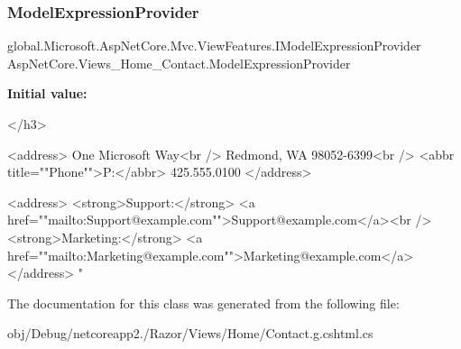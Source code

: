 \subsubsection{\texorpdfstring{Model\+Expression\+Provider}{ModelExpressionProvider}}
{\footnotesize\ttfamily global.\+Microsoft.\+Asp\+Net\+Core.\+Mvc.\+View\+Features.\+I\+Model\+Expression\+Provider Asp\+Net\+Core.\+Views\+\_\+\+Home\+\_\+\+Contact.\+Model\+Expression\+Provider\hspace{0.3cm}{\ttfamily [get]}}

{\bfseries Initial value\+:}
\begin{DoxyCode}
</h3>

<address>
    One Microsoft Way<br />
    Redmond, WA 98052-6399<br />
    <abbr title=\textcolor{stringliteral}{""}Phone\textcolor{stringliteral}{""}>P:</abbr>
    425.555.0100
</address>

<address>
    <strong>Support:</strong> <a href=\textcolor{stringliteral}{""}mailto:Support@example.com\textcolor{stringliteral}{""}>Support@example.com</a><br />
    <strong>Marketing:</strong> <a href=\textcolor{stringliteral}{""}mailto:Marketing@example.com\textcolor{stringliteral}{""}>Marketing@example.com</a>
</address>
\textcolor{stringliteral}{"}
\end{DoxyCode}


The documentation for this class was generated from the following file\+:\begin{DoxyCompactItemize}
\item 
obj/\+Debug/netcoreapp2./\+Razor/\+Views/\+Home/Contact.\+g.\+cshtml.\+cs\end{DoxyCompactItemize}
